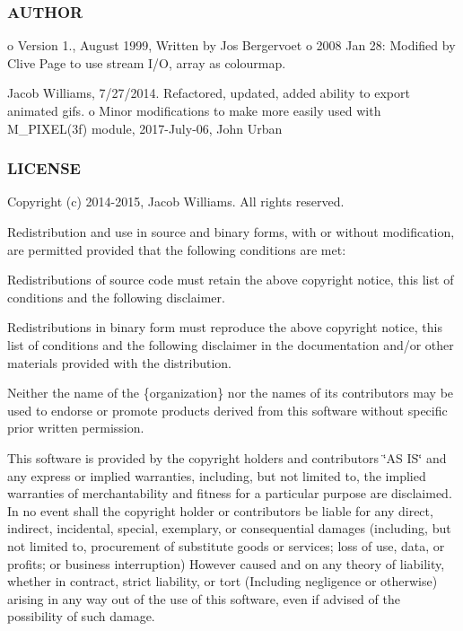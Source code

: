 \subsubsection*{A\+U\+T\+H\+OR}

o Version 1., August 1999, Written by Jos Bergervoet o 2008 Jan 28\+: Modified by Clive Page to use stream I/O, array as colourmap.
\begin{DoxyItemize}
\item Jacob Williams, 7/27/2014. Refactored, updated, added ability to export animated gifs. o Minor modifications to make more easily used with M\+\_\+\+P\+I\+X\+E\+L(3f) module, 2017-\/\+July-\/06, John Urban \subsubsection*{L\+I\+C\+E\+N\+SE}
\end{DoxyItemize}

Copyright (c) 2014-\/2015, Jacob Williams. All rights reserved.

Redistribution and use in source and binary forms, with or without modification, are permitted provided that the following conditions are met\+:


\begin{DoxyItemize}
\item Redistributions of source code must retain the above copyright notice, this list of conditions and the following disclaimer.
\item Redistributions in binary form must reproduce the above copyright notice, this list of conditions and the following disclaimer in the documentation and/or other materials provided with the distribution.
\item Neither the name of the \{organization\} nor the names of its contributors may be used to endorse or promote products derived from this software without specific prior written permission.
\end{DoxyItemize}

This software is provided by the copyright holders and contributors \char`\"{}\+A\+S I\+S\char`\"{} and any express or implied warranties, including, but not limited to, the implied warranties of merchantability and fitness for a particular purpose are disclaimed. In no event shall the copyright holder or contributors be liable for any direct, indirect, incidental, special, exemplary, or consequential damages (including, but not limited to, procurement of substitute goods or services; loss of use, data, or profits; or business interruption) However caused and on any theory of liability, whether in contract, strict liability, or tort (Including negligence or otherwise) arising in any way out of the use of this software, even if advised of the possibility of such damage. 

